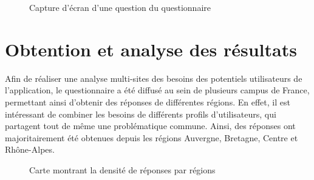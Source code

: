 \begin{figure}[H]
    \label{fig-qcm-question}
    \noindent{}
    \caption{Capture d'écran d'une question du questionnaire}
\end{figure}

\section{Obtention et analyse des résultats}

Afin de réaliser une analyse multi-sites des besoins des potentiels utilisateurs de l'application, le questionnaire a été diffusé au sein de plusieurs campus de France, permettant ainsi d'obtenir des réponses de différentes régions. En effet, il est intéressant de combiner les besoins de différents profils d'utilisateurs, qui partagent tout de même une problématique commune. Ainsi, des réponses ont majoritairement été obtenues depuis les régions Auvergne, Bretagne, Centre et Rhône-Alpes. \\


\begin{figure}[H]
    \label{fig-carte-reponses}
    \noindent{}
    \caption{Carte montrant la densité de réponses par régions}
\end{figure}

